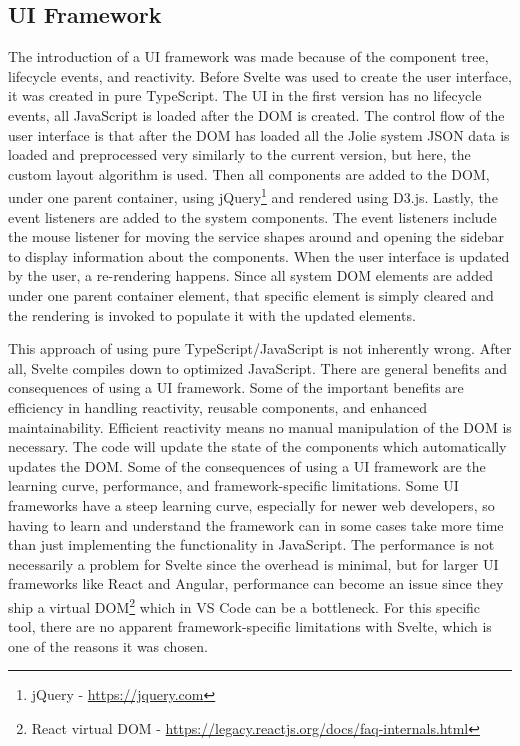 \subsection{UI Framework}
The introduction of a UI framework was made because of the component tree, lifecycle events, and reactivity. Before Svelte was used to create the user interface, it was created in pure TypeScript.
The UI in the first version has no lifecycle events, all JavaScript is loaded after the DOM is created.
The control flow of the user interface is that after the DOM has loaded all the Jolie system JSON data is loaded and preprocessed very similarly to the current version, but here, the custom layout algorithm is used.
Then all components are added to the DOM, under one parent container, using jQuery\footnote{jQuery - \url{https://jquery.com}} and rendered using D3.js. Lastly, the event listeners are added to the system components. The event listeners include the mouse listener for moving the service shapes around and opening the sidebar to display information about the components.
When the user interface is updated by the user, a re-rendering happens. Since all system DOM elements are added under one parent container element, that specific element is simply cleared and the rendering is invoked to populate it with the updated elements.

This approach of using pure TypeScript/JavaScript is not inherently wrong. After all, Svelte compiles down to optimized JavaScript.
There are general benefits and consequences of using a UI framework. Some of the important benefits are efficiency in handling reactivity, reusable components, and enhanced maintainability.
Efficient reactivity means no manual manipulation of the DOM is necessary. The code will update the state of the components which automatically updates the DOM.
Some of the consequences of using a UI framework are the learning curve, performance, and framework-specific limitations.
Some UI frameworks have a steep learning curve, especially for newer web developers, so having to learn and understand the framework can in some cases take more time than just implementing the functionality in JavaScript.
The performance is not necessarily a problem for Svelte since the overhead is minimal, but for larger UI frameworks like React and Angular, performance can become an issue since they ship a virtual DOM\footnote{React virtual DOM - \url{https://legacy.reactjs.org/docs/faq-internals.html}} which in VS Code can be a bottleneck.
For this specific tool, there are no apparent framework-specific limitations with Svelte, which is one of the reasons it was chosen.

